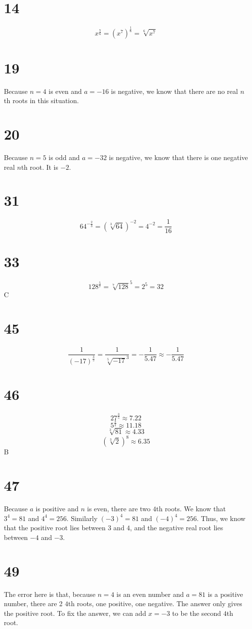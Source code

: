 \documentclass{article}
\theoremstyle{definition}
\begin{document}
\section*{14}
\[ x^\frac{7}{6}=(x^7)^\frac{1}{6}=\sqrt[6]{x^7} \]

\section*{19}
Because $n=4$ is even and $a=-16$ is negative, we know that there are no real $n$th roots in this situation.

\section*{20}
Because $n=5$ is odd and $a=-32$ is negative, we know that there is one negative real $n$th root. It is $-2$.

\section*{31}
\[ 64^{-\frac{2}{3}}=(\sqrt[3]{64})^{-2}=4^{-2}=\frac{1}{16} \]

\section*{33}
\[ 128^\frac{5}{7}=\sqrt[7]{128}^5=2^5=32 \]
C

\section*{45}
\[ \frac{1}{(-17)^\frac{3}{5}}=\frac{1}{\sqrt[5]{-17}^3}=-\frac{1}{5.47}\approx -\frac{1}{5.47}\]

\section*{46}
\[ 27^\frac{3}{5}\approx 7.22 \]
\[ 5^\frac{3}{2}\approx 11.18 \]
\[ \sqrt[3]{81}\approx 4.33 \]
\[ (\sqrt[3]{2})^8\approx 6.35 \]
B

\section*{47}
Because $a$ is positive and $n$ is even, there are two $4$th roots. We know that $3^4=81$ and $4^4=256$. Similarly $(-3)^4=81$ and $(-4)^4=256$. Thus, we know that the 
positive root lies between $3$ and $4$, and the negative real root lies between $-4$ and $-3$.

\section*{49}
The error here is that, because $n=4$ is an even number and $a=81$ is a positive number, there are 2 $4$th roots, one positive, one negative. The answer only gives 
the positive root. To fix the answer, we can add $x=-3$ to be the second $4$th root. 
\end{document}
